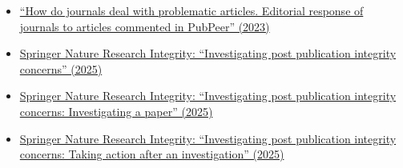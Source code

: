 \documentclass[letterpaper, 12pt]{article}
\begin{document}
\begin{itemize}
    \setlength\itemsep{-0.5em}
    \item \href{https://doi.org/10.3145/epi.2023.ene.18}{``How do journals deal with problematic articles. Editorial response of journals to articles commented in PubPeer'' (2023)}
    \item \href{https://www.youtube.com/watch?v=NMc2yY-wLWw}{Springer Nature Research Integrity: ``Investigating post publication integrity concerns'' (2025)}
    \item \href{https://www.youtube.com/watch?v=WRD6RpIMgyI}{Springer Nature Research Integrity: ``Investigating post publication integrity concerns: Investigating a paper'' (2025)}
    \item \href{https://www.youtube.com/watch?v=wUqoOBXz_jw}{Springer Nature Research Integrity: ``Investigating post publication integrity concerns: Taking action after an investigation'' (2025)}
\end{itemize}
\end{document}

